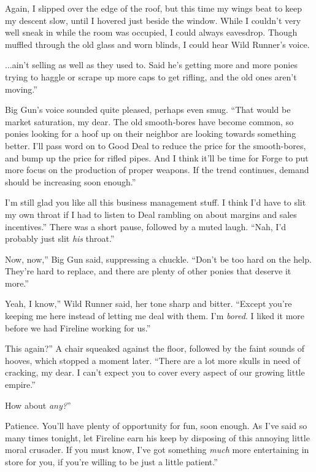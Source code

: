 Again, I slipped over the edge of the roof, but this time my wings beat to keep my descent slow, until I hovered just beside the window. While I couldn’t very well sneak in while the room was occupied, I could always eavesdrop. Though muffled through the old glass and worn blinds, I could hear Wild Runner’s voice.

\leavevmode{}...ain’t selling as well as they used to. Said he’s getting more and more ponies trying to haggle or scrape up more caps to get rifling, and the old ones aren’t moving.”

Big Gun’s voice sounded quite pleased, perhaps even smug. “That would be market saturation, my dear. The old smooth-bores have become common, so ponies looking for a hoof up on their neighbor are looking towards something better. I’ll pass word on to Good Deal to reduce the price for the smooth-bores, and bump up the price for rifled pipes. And I think it’ll be time for Forge to put more focus on the production of proper weapons. If the trend continues, demand should be increasing soon enough.”

\leavevmode{}I’m still glad you like all this business management stuff. I think I’d have to slit my own throat if I had to listen to Deal rambling on about margins and sales incentives.” There was a short pause, followed by a muted laugh. “Nah, I’d probably just slit \textit{his} throat.”

\leavevmode{}Now, now,” Big Gun said, suppressing a chuckle. “Don’t be too hard on the help. They’re hard to replace, and there are plenty of other ponies that deserve it more.”

\leavevmode{}Yeah, I know,” Wild Runner said, her tone sharp and bitter. “Except you’re keeping me here instead of letting me deal with them. I’m \textit{bored}. I liked it more before we had Fireline working for us.”

\leavevmode{}This again?” A chair squeaked against the floor, followed by the faint sounds of hooves, which stopped a moment later. “There are a lot more skulls in need of cracking, my dear. I can’t expect you to cover every aspect of our growing little empire.”

\leavevmode{}How about \textit{any?}”

\leavevmode{}Patience. You’ll have plenty of opportunity for fun, soon enough. As I’ve said so many times tonight, let Fireline earn his keep by disposing of this annoying little moral crusader. If you must know, I’ve got something \textit{much} more entertaining in store for you, if you’re willing to be just a little patient.”

